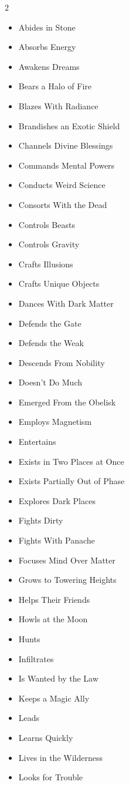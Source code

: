 \begin{multicols}{2}
\begin{itemize}
\item Abides in Stone
\item Absorbs Energy
\item Awakens Dreams
\item Bears a Halo of Fire
\item Blazes With Radiance
\item Brandishes an Exotic Shield
\item Channels Divine Blessings
\item Commands Mental Powers
\item Conducts Weird Science
\item Consorts With the Dead
\item Controls Beasts
\item Controls Gravity
\item Crafts Illusions
\item Crafts Unique Objects
\item Dances With Dark Matter
\item Defends the Gate
\item Defends the Weak
\item Descends From Nobility
\item Doesn’t Do Much
\item Emerged From the Obelisk
\item Employs Magnetism
\item Entertains
\item Exists in Two Places at Once
\item Exists Partially Out of Phase
\item Explores Dark Places 
\item Fights Dirty
\item Fights With Panache 
\item Focuses Mind Over Matter
\item Grows to Towering Heights 
\item Helps Their Friends
\item Howls at the Moon
\item Hunts
\item Infiltrates
\item Is Wanted by the Law 
\item Keeps a Magic Ally
\item Leads
\item Learns Quickly
\item Lives in the Wilderness
\item Looks for Trouble

\end{itemize}
\end{multicols}
